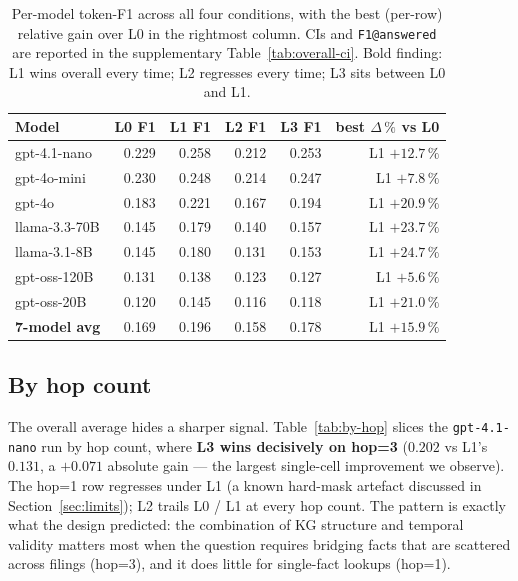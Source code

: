 \documentclass[11pt]{article}
\begin{document}
\begin{table}[t]
\centering
\small
\setlength{\tabcolsep}{3pt}
\begin{tabular}{l rrrr r}
\toprule
Model          & L0 F1 & L1 F1 & L2 F1 & L3 F1 & best $\Delta\,\%$ vs L0 \\
\midrule
gpt-4.1-nano   & 0.229 & 0.258 & 0.212 & 0.253 & L1 $+12.7\,\%$ \\
gpt-4o-mini    & 0.230 & 0.248 & 0.214 & 0.247 & L1 $+7.8\,\%$ \\
gpt-4o         & 0.183 & 0.221 & 0.167 & 0.194 & L1 $+20.9\,\%$ \\
llama-3.3-70B  & 0.145 & 0.179 & 0.140 & 0.157 & L1 $+23.7\,\%$ \\
llama-3.1-8B   & 0.145 & 0.180 & 0.131 & 0.153 & L1 $+24.7\,\%$ \\
gpt-oss-120B   & 0.131 & 0.138 & 0.123 & 0.127 & L1 $+5.6\,\%$ \\
gpt-oss-20B    & 0.120 & 0.145 & 0.116 & 0.118 & L1 $+21.0\,\%$ \\
\midrule
\textbf{7-model avg} & 0.169 & 0.196 & 0.158 & 0.178 & L1 $+15.9\,\%$ \\
\bottomrule
\end{tabular}
\caption{Per-model token-F1 across all four conditions, with the best
(per-row) relative gain over L0 in the rightmost column. CIs and
\texttt{F1@answered} are reported in the supplementary
Table~\ref{tab:overall-ci}. Bold finding: L1 wins overall every time;
L2 regresses every time; L3 sits between L0 and L1.}
\label{tab:overall}
\end{table}

\subsection{By hop count}
\label{sec:r-hop}
The overall average hides a sharper signal. Table~\ref{tab:by-hop}
slices the \texttt{gpt-4.1-nano} run by hop count, where
\textbf{L3 wins decisively on hop=3} ($0.202$ vs L1's $0.131$, a
$+0.071$ absolute gain --- the largest single-cell improvement we
observe). The hop=1 row regresses under L1 (a known hard-mask artefact
discussed in Section~\ref{sec:limits}); L2 trails L0 / L1 at every
hop count. The pattern is exactly what the design predicted: the
combination of KG structure and temporal validity matters most when
the question requires bridging facts that are scattered across
filings (hop=3), and it does little for single-fact lookups (hop=1).
\end{document}
